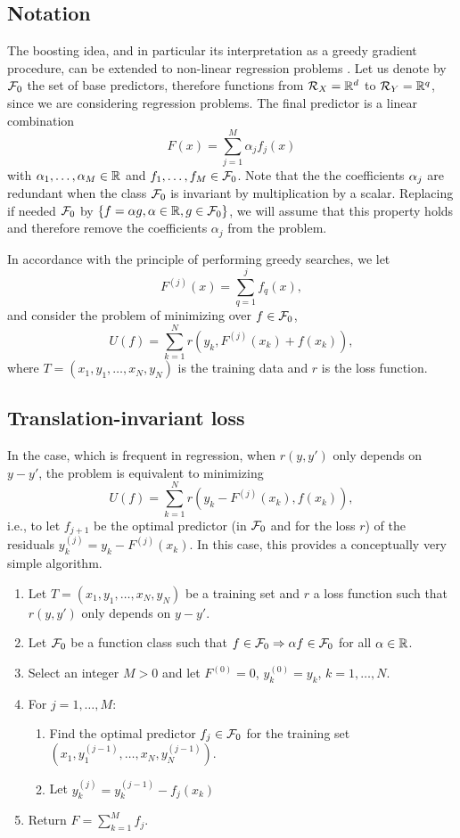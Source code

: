 \subsection{Notation}
The boosting idea, and in particular its interpretation as a greedy gradient procedure,  can be extended to non-linear regression problems \citep{friedman2001greedy}. 
Let us denote by ${\mathcal F}_0$ the set of base predictors, therefore functions from ${\mathcal R}_X= {\mathbb{R}}^d$ to $ {\mathcal R}_Y = {\mathbb{R}}^q$, since we are considering regression problems. The final predictor is  a linear combination
\[
F(x) = \sum_{j=1}^M \alpha_j f_j(x)
\]
with $\alpha_1, \ldots, \alpha_M\in {\mathbb{R}}$ and $f_1, \ldots, f_M\in {\mathcal F}_0$. Note that the 
the coefficients  $\alpha_j$ are redundant when the class ${\mathcal F}_0$ is invariant by multiplication by a scalar. Replacing if needed ${\mathcal F}_0$ by $\left\{ f = \alpha g, \alpha\in {\mathbb{R}}, g\in {\mathcal F}_0 \right\}$, we will assume that this property holds and therefore remove the coefficients $\alpha_j$ from the problem.


In accordance  with the principle  of performing greedy searches, we let 
\[
F^{(j)}(x) = \sum_{q=1}^j  f_q(x),
\]
and consider the problem of minimizing over $f\in {\mathcal F}_0$,
\[
U( f) = \sum_{k=1}^N r(y_k, F^{(j)}(x_k) + f(x_k)),
\]
where $T = (x_1, y_1, \ldots, x_N, y_N)$ is the training data and $r$ is the loss function. 


\subsection{Translation-invariant loss}
In the case, which is frequent in regression, when $r(y,y')$ only depends on $y-y'$, the problem is equivalent to minimizing
\[
U( f) = \sum_{k=1}^N r(y_k- F^{(j)}(x_k), f(x_k)),
\]
i.e., to let $f_{j+1}$ be the optimal predictor (in ${\mathcal F}_0$ and for the loss $r$) of the residuals $y_k^{(j)} = y_k- F^{(j)}(x_k)$. In this case, this provides a conceptually very simple algorithm.
\begin{algorithm}
\begin{enumerate}[label=$\bullet$]
\item Let $T = (x_1, y_1, \ldots, x_N, y_N)$ be a training set and $r$ a loss function such that $r(y,y')$ only depends on $y-y'$.
\item Let ${\mathcal F}_0$ be a function class such that $f\in{\mathcal F}_0\Rightarrow \alpha f\in {\mathcal F}_0$ for all $\alpha\in {\mathbb{R}}$.
\item Select an integer $M>0$ and let $F^{(0)} = 0$, $y_k^{(0)} = y_k$, $k=1, \ldots, N$.
\item For $j=1, \ldots, M$:
\begin{enumerate}[wide=0.5cm]
\item Find the optimal predictor $f_{j}\in {\mathcal F}_0$ for the training set $(x_1, y_1^{(j-1)}, \ldots, x_N, y_N^{(j-1)})$.
\item Let $y_k^{(j)} = y_{k}^{(j-1)} - f_j(x_k)$ 
\end{enumerate}
\item Return $F = \sum_{k=1}^M f_j$.
\end{enumerate}

\end{algorithm}

